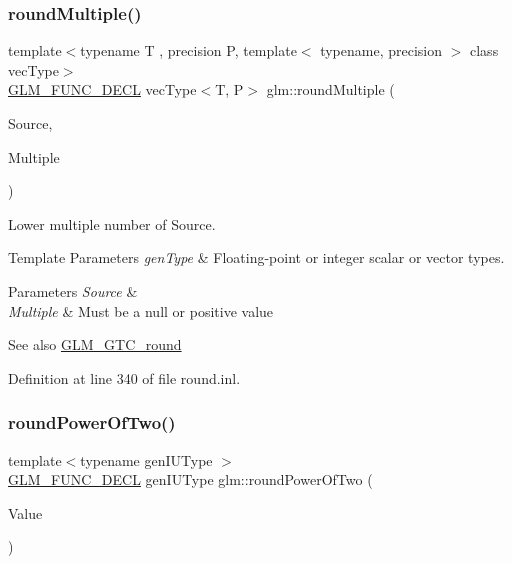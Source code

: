 \subsubsection{\texorpdfstring{roundMultiple()}{roundMultiple()}\hspace{0.1cm}{\footnotesize\ttfamily [2/2]}}
{\footnotesize\ttfamily template$<$typename T , precision P, template$<$ typename, precision $>$ class vec\+Type$>$ \\
\mbox{\hyperlink{setup_8hpp_ab2d052de21a70539923e9bcbf6e83a51}{G\+L\+M\+\_\+\+F\+U\+N\+C\+\_\+\+D\+E\+CL}} vec\+Type$<$T, P$>$ glm\+::round\+Multiple (\begin{DoxyParamCaption}\item[{vec\+Type$<$ T, P $>$ const \&}]{Source,  }\item[{vec\+Type$<$ T, P $>$ const \&}]{Multiple }\end{DoxyParamCaption})}

Lower multiple number of Source.


\begin{DoxyTemplParams}{Template Parameters}
{\em gen\+Type} & Floating-\/point or integer scalar or vector types. \\
\hline
\end{DoxyTemplParams}

\begin{DoxyParams}{Parameters}
{\em Source} & \\
\hline
{\em Multiple} & Must be a null or positive value\\
\hline
\end{DoxyParams}
\begin{DoxySeeAlso}{See also}
\mbox{\hyperlink{group__gtc__round}{G\+L\+M\+\_\+\+G\+T\+C\+\_\+round}} 
\end{DoxySeeAlso}


Definition at line 340 of file round.\+inl.

\mbox{\label{group__gtc__round_ga6d24a9e3abe3e6a908661b43acb8efe0}} 
\subsubsection{\texorpdfstring{roundPowerOfTwo()}{roundPowerOfTwo()}\hspace{0.1cm}{\footnotesize\ttfamily [1/2]}}
{\footnotesize\ttfamily template$<$typename gen\+I\+U\+Type $>$ \\
\mbox{\hyperlink{setup_8hpp_ab2d052de21a70539923e9bcbf6e83a51}{G\+L\+M\+\_\+\+F\+U\+N\+C\+\_\+\+D\+E\+CL}} gen\+I\+U\+Type glm\+::round\+Power\+Of\+Two (\begin{DoxyParamCaption}\item[{gen\+I\+U\+Type}]{Value }\end{DoxyParamCaption})}

